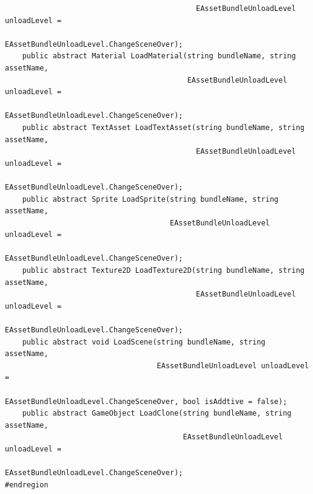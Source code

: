 \documentclass[9pt, b5paper]{article}
\begin{document}
\begin{itemize}
\begin{verbatim}
                                            EAssetBundleUnloadLevel unloadLevel = 
                                            EAssetBundleUnloadLevel.ChangeSceneOver);
    public abstract Material LoadMaterial(string bundleName, string assetName, 
                                          EAssetBundleUnloadLevel unloadLevel = 
                                          EAssetBundleUnloadLevel.ChangeSceneOver);
    public abstract TextAsset LoadTextAsset(string bundleName, string assetName, 
                                            EAssetBundleUnloadLevel unloadLevel = 
                                            EAssetBundleUnloadLevel.ChangeSceneOver);
    public abstract Sprite LoadSprite(string bundleName, string assetName, 
                                      EAssetBundleUnloadLevel unloadLevel = 
                                      EAssetBundleUnloadLevel.ChangeSceneOver);
    public abstract Texture2D LoadTexture2D(string bundleName, string assetName, 
                                            EAssetBundleUnloadLevel unloadLevel = 
                                            EAssetBundleUnloadLevel.ChangeSceneOver);
    public abstract void LoadScene(string bundleName, string assetName, 
                                   EAssetBundleUnloadLevel unloadLevel = 
                                   EAssetBundleUnloadLevel.ChangeSceneOver, bool isAddtive = false);
    public abstract GameObject LoadClone(string bundleName, string assetName, 
                                         EAssetBundleUnloadLevel unloadLevel = 
                                         EAssetBundleUnloadLevel.ChangeSceneOver);
#endregion


\end{verbatim}
\end{itemize}
\end{document}
